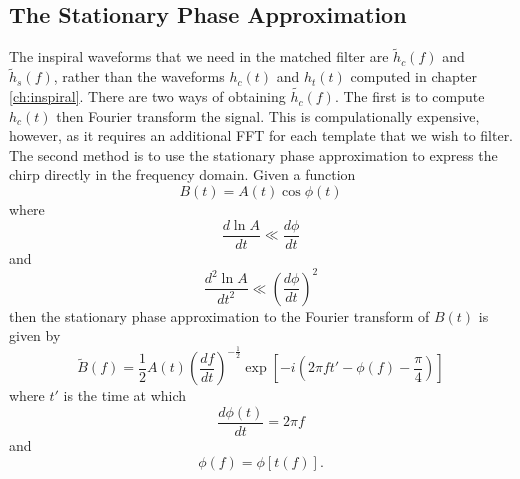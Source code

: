 \subsection{The Stationary Phase Approximation}
\label{ss:stationaryphase}

The inspiral waveforms that we need in the matched filter are $\tilde{h}_c(f)$
and $\tilde{h}_s(f)$, rather than the waveforms $h_c(t)$ and $h_t(t)$ computed
in chapter \ref{ch:inspiral}. There are two ways of obtaining $\tilde{h_c}(f)$.
The first is to compute $h_c(t)$ then Fourier transform the signal. This is
compulationally expensive, however, as it requires an additional FFT for each
template that we wish to filter. The second method is to use the stationary phase
approximation\cite{Mathews:1992} to express the chirp directly in the frequency
domain\cite{WillWiseman:1996,Cutler:1994}. Given a function
\begin{equation}
B(t) = A(t) \cos \phi(t)
\end{equation}
where
\begin{equation}
\frac{d\ln A}{dt} \ll \frac{d\phi}{dt}
\end{equation}
and
\begin{equation}
\frac{d^2\ln A}{dt^2} \ll \left(\frac{d\phi}{dt}\right)^2
\end{equation}
then the stationary phase approximation to the Fourier transform of $B(t)$ is
given by
\begin{equation}
\tilde{B}(f) = \frac{1}{2} A(t) \left(\frac{df}{dt}\right)^{-\frac{1}{2}}
\exp\left[ -i \left(2\pi f t' - \phi(f) - \frac{\pi}{4} \right)\right]
\end{equation}
where $t'$ is the time at which
\begin{equation}
\frac{d\phi(t)}{dt} = 2\pi f
\end{equation}
and
\begin{equation}
\phi(f) = \phi\left[t(f)\right].
\end{equation}

